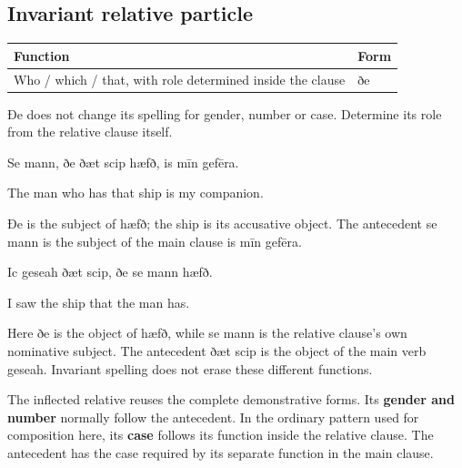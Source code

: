 \subsection*{Invariant relative particle}

\par\begingroup
\fontsize{10.5}{13.2}\selectfont
\setlength{\LTleft}{0pt}\setlength{\LTright}{\fill}
\noindent
\begin{tabular}{@{}>{\raggedright\arraybackslash}p{92.06mm}>{\raggedright\arraybackslash}p{29.13mm}@{}}
\toprule
\textbf{Function} & \textbf{Form} \\
\midrule
Who /\allowbreak{} which /\allowbreak{} that, with role determined inside the clause & ðe \\
\bottomrule
\end{tabular}
\par\endgroup

Ðe does not change its spelling for gender, number or case. Determine its role from the relative clause itself.

Se mann, ðe ðæt scip hæfð, is mīn gefēra.

The man who has that ship is my companion.

Ðe is the subject of hæfð; the ship is its accusative object. The antecedent se mann is the subject of the main clause is mīn gefēra.

Ic geseah ðæt scip, ðe se mann hæfð.

I saw the ship that the man has.

Here ðe is the object of hæfð, while se mann is the relative clause’s own nominative subject. The antecedent ðæt scip is the object of the main verb geseah. Invariant spelling does not erase these different functions.

The inflected relative reuses the complete demonstrative forms. Its \textbf{gender and number} normally follow the antecedent. In the ordinary pattern used for composition here, its \textbf{case} follows its function inside the relative clause. The antecedent has the case required by its separate function in the main clause.

